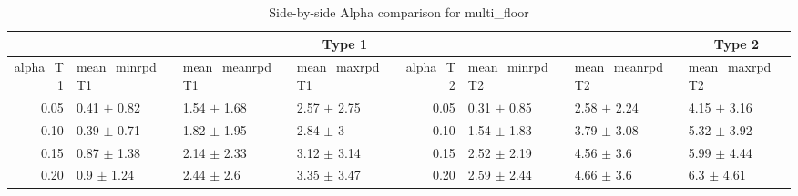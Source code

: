 \begin{table}[ht]
\centering
\begin{tabular}{rlllrlll}
  \multicolumn{7}{c}{Type 1} & \multicolumn{7}{c}{Type 2} \\ 
 \hline
alpha_T1 & mean_minrpd_T1 & mean_meanrpd_T1 & mean_maxrpd_T1 & alpha_T2 & mean_minrpd_T2 & mean_meanrpd_T2 & mean_maxrpd_T2 \\ 
  \hline
0.05 & 0.41 $\pm$ 0.82 & 1.54 $\pm$ 1.68 & 2.57 $\pm$ 2.75 & 0.05 & 0.31 $\pm$ 0.85 & 2.58 $\pm$ 2.24 & 4.15 $\pm$ 3.16 \\ 
  0.10 & 0.39 $\pm$ 0.71 & 1.82 $\pm$ 1.95 & 2.84 $\pm$ 3 & 0.10 & 1.54 $\pm$ 1.83 & 3.79 $\pm$ 3.08 & 5.32 $\pm$ 3.92 \\ 
  0.15 & 0.87 $\pm$ 1.38 & 2.14 $\pm$ 2.33 & 3.12 $\pm$ 3.14 & 0.15 & 2.52 $\pm$ 2.19 & 4.56 $\pm$ 3.6 & 5.99 $\pm$ 4.44 \\ 
  0.20 & 0.9 $\pm$ 1.24 & 2.44 $\pm$ 2.6 & 3.35 $\pm$ 3.47 & 0.20 & 2.59 $\pm$ 2.44 & 4.66 $\pm$ 3.6 & 6.3 $\pm$ 4.61 \\ 
   \hline
\end{tabular}
\caption{Side-by-side Alpha comparison for multi_floor} 
\end{table}
